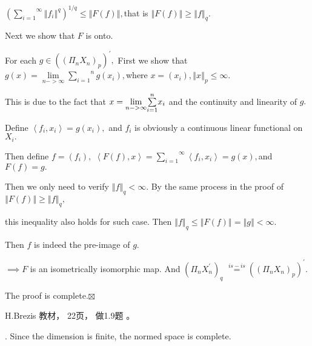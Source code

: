 \documentclass{article}
\begin{document}
$\left( \overset{\infty }{\underset{i=1}{\sum }}\left\Vert f_{i}\right\Vert
^{q}\right) ^{1/q}\leq \left\Vert F\left( f\right) \right\Vert ,$that is $%
\left\Vert F\left( f\right) \right\Vert \geq \left\Vert f\right\Vert _{q}.$

Next we show that $F$ is onto.

For each $g\in \left( \left( \Pi _{n}X_{n}\right) _{p}\right) ^{\prime },$%
First we show that $g\left( x\right) =\underset{n->\infty }{\lim }\overset{n}%
{\underset{i=1}{\sum }}g\left( x_{i}\right) ,$where $x=\left( x_{i}\right)
,\left\Vert x\right\Vert _{p}\leq \infty .$

This is due to the fact that $x=\underset{n->\infty }{\lim }\overset{n}{%
\underset{i=1}{\sum }}x_{i}$ and the continuity and linearity of $g.$

Define $\left\langle f_{i},x_{i}\right\rangle =g\left( x_{i}\right) ,$ and $%
f_{i}$ is obviously a continuous linear functional on $X_{i}.$

Then define $f=\left( f_{i}\right) ,$ $\left\langle F\left( f\right)
,x\right\rangle =\overset{\infty }{\underset{i=1}{\sum }}\left\langle
f_{i},x_{i}\right\rangle =g\left( x\right) ,$and $F\left( f\right) =g.$

Then we only need to verify $\left\Vert f\right\Vert _{q}<\infty .$ By the
same process in the proof of $\left\Vert F\left( f\right) \right\Vert \geq
\left\Vert f\right\Vert _{q},$

this inequality also holds for such case. Then $\left\Vert f\right\Vert
_{q}\leq \left\Vert F\left( f\right) \right\Vert =\left\Vert g\right\Vert
<\infty .$

\bigskip Then $f$ is indeed the pre-image of $g.$

$\implies F$ is an isometrically isomorphic map. And $\left( \Pi
_{n}X_{n}^{\prime }\right) _{q}$ $\overset{is-is}{=}\left( \left( \Pi
_{n}X_{n}\right) _{p}\right) ^{\prime }.$

The proof is complete.$\boxtimes $

H.Brezis 教材， 22页， 做1.9题%
。


. Since the dimension is finite, the normed space is complete.
\end{document}
